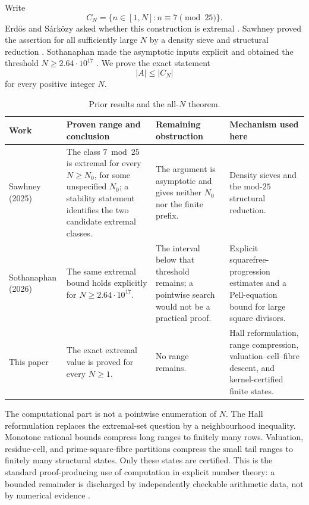 \documentclass[11pt]{article}
\theoremstyle{definition}
\newcommand{\CN}{C_N}
\begin{document}
Write
\[
  \CN=\{n\in[1,N]:n\equiv7\pmod {25}\}.
\]
Erd\H{o}s and S\'ark\"ozy asked whether this construction is extremal
\cite{Erdos848Original}.  Sawhney proved the assertion for all sufficiently
large $N$ by a density sieve and structural reduction
\cite{Sawhney848}.  Sothanaphan made the asymptotic inputs explicit and
obtained the threshold $N\geq2.64\cdot10^{17}$
\cite{Sothanaphan848}.  We prove the exact statement
\begin{equation}\label{eq:target}
  |A|\leq|\CN|
\end{equation}
for every positive integer $N$.

\begin{table}[ht]
\centering
\footnotesize
\renewcommand{\arraystretch}{1.16}
\begin{tabularx}{\textwidth}{@{}>{\raggedright\arraybackslash}p{}Y Y Y@{}}
\toprule
Work & Proven range and conclusion & Remaining obstruction & Mechanism used here\\
\midrule
Sawhney (2025) &
The class $7\bmod25$ is extremal for every $N\geq N_0$, for some
unspecified $N_0$; a stability statement identifies the two candidate
extremal classes. &
The argument is asymptotic and gives neither $N_0$ nor the finite prefix. &
Density sieves and the mod-$25$ structural reduction.\\
\addlinespace
Sothanaphan (2026) &
The same extremal bound holds explicitly for
$N\geq2.64\cdot10^{17}$. &
The interval below that threshold remains; a pointwise search would not be a
practical proof. &
Explicit squarefree-progression estimates and a Pell-equation bound for
large square divisors.\\
\addlinespace
This paper &
The exact extremal value is proved for every $N\geq1$. &
No range remains. &
Hall reformulation, range compression, valuation--cell--fibre descent, and
kernel-certified finite states.\\
\bottomrule
\end{tabularx}
\caption{Prior results and the all-$N$ theorem.}
\label{tab:prior-work}
\end{table}

The computational part is not a pointwise enumeration of $N$.  The Hall
reformulation replaces the extremal-set question by a neighbourhood
inequality.  Monotone rational bounds compress long ranges to finitely many
rows.  Valuation, residue-cell, and prime-square-fibre partitions compress
the small tail ranges to finitely many structural states.  Only these states
are certified.  This is the standard proof-producing use of computation in
explicit number theory: a bounded remainder is discharged by independently
checkable arithmetic data, not by numerical evidence
\cite{HelfgottPlatt,OliveiraSilvaHerzogPardi}.
\end{document}
